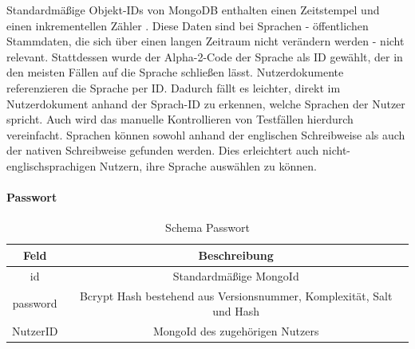 Standardmäßige Objekt-IDs von MongoDB enthalten einen Zeitstempel und einen inkrementellen Zähler \cite{db:mongoObjectId}.
 Diese Daten sind bei Sprachen - öffentlichen Stammdaten, die sich über einen langen Zeitraum nicht verändern werden - nicht relevant.
Stattdessen wurde der Alpha-2-Code der Sprache als ID gewählt, der in den meisten Fällen auf die Sprache schließen lässt.
Nutzerdokumente referenzieren die Sprache per ID.
Dadurch fällt es leichter, direkt im Nutzerdokument anhand der Sprach-ID zu erkennen, welche Sprachen der Nutzer spricht.
Auch wird das manuelle Kontrollieren von Testfällen hierdurch vereinfacht.
Sprachen können sowohl anhand der englischen Schreibweise als auch der nativen Schreibweise gefunden werden.
Dies erleichtert auch nicht-englischsprachigen Nutzern, ihre Sprache auswählen zu können.

\paragraph{Passwort\\}
\begin{table}
    \centering
    \begin{tabular}{ |c|c| }
        \hline
        Feld & Beschreibung  \\
        \hline
        id & Standardmäßige MongoId \\
        password & Bcrypt Hash bestehend aus Versionsnummer, Komplexität, Salt und Hash \\
        NutzerID & MongoId des zugehörigen Nutzers \\
        \hline
    \end{tabular}
    \caption{Schema Passwort}
    \label{db:table:passwort}
\end{table}

